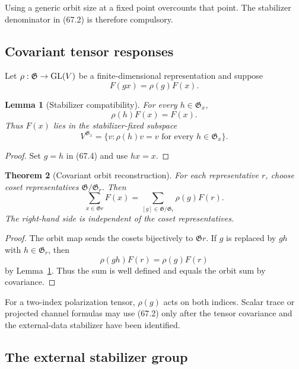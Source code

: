 \documentclass[11pt]{article}
\newtheorem{theorem}{Theorem}[section]
\newtheorem{lemma}[theorem]{Lemma}
\begin{document}
Using a generic orbit size at a fixed point overcounts that point.
The stabilizer denominator in (67.2) is therefore compulsory.

\subsection{Covariant tensor responses}

Let \(\rho:{\mathfrak G}\to{\rm GL}(V)\) be a finite-dimensional
representation and suppose
\[
                              F(gx)=\rho(g)F(x).               \tag{67.4}
\]

\begin{lemma}[Stabilizer compatibility]
\label{lem:v11v67-stabilizer}
For every \(h\in{\mathfrak G}_x\),
\[
                              \rho(h)F(x)=F(x).                \tag{67.5}
\]
Thus \(F(x)\) lies in the stabilizer-fixed subspace
\[
                  V^{{\mathfrak G}_x}
      =\{v:\rho(h)v=v\text{ for every }h\in{\mathfrak G}_x\}. \tag{67.6}
\]
\end{lemma}

\begin{proof}
Set \(g=h\) in (67.4) and use \(hx=x\).
\end{proof}

\begin{theorem}[Covariant orbit reconstruction]
\label{thm:v11v67-covariant}
For each representative \(r\), choose coset representatives
\({\mathfrak G}/{\mathfrak G}_r\).  Then
\[
                    \sum_{x\in{\mathfrak G}r}F(x)
       =\sum_{[g]\in{\mathfrak G}/{\mathfrak G}_r}\rho(g)F(r).
                                                                  \tag{67.7}
\]
The right-hand side is independent of the coset representatives.
\end{theorem}

\begin{proof}
The orbit map sends the cosets bijectively to \({\mathfrak G}r\).
If \(g\) is replaced by \(gh\) with \(h\in{\mathfrak G}_r\), then
\[
                         \rho(gh)F(r)=\rho(g)F(r)
\]
by Lemma~\ref{lem:v11v67-stabilizer}.  Thus the sum is well defined
and equals the orbit sum by covariance.
\end{proof}

For a two-index polarization tensor,
\(\rho(g)\) acts on both indices.  Scalar trace or projected channel
formulas may use (67.2) only after the tensor covariance and the
external-data stabilizer have been identified.

\subsection{The external stabilizer group}
\end{document}
